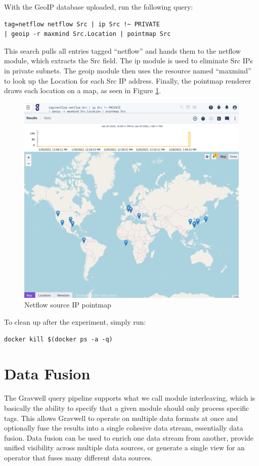 With the GeoIP database uploaded, run the following query:

\begin{Verbatim}[breaklines=true]
tag=netflow netflow Src | ip Src !~ PRIVATE
| geoip -r maxmind Src.Location | pointmap Src
\end{Verbatim}

This search pulls all entries tagged ``netflow'' and hands them to the
netflow module, which extracts the Src field. The ip module is used to
eliminate Src IPs in private subnets. The geoip module then uses the
resource named ``maxmind'' to look up the Location for each Src IP
address. Finally, the pointmap renderer draws each location on a map, as
seen in Figure \ref{fig:maxmind-pointmap}.

\begin{figure}[H]
	\includegraphics[width=0.7\linewidth]{images/maxmind-pointmap.png}
	\caption{Netflow source IP pointmap}
	\label{fig:maxmind-pointmap}
\end{figure}

To clean up after the experiment, simply run:

\begin{Verbatim}[breaklines=true]
docker kill $(docker ps -a -q)
\end{Verbatim}







\section{Data Fusion}

The Gravwell query pipeline supports what we call module interleaving,
which is basically the ability to specify that a given module should only process
specific tags. This allows Gravwell to operate on multiple data formats
at once and optionally fuse the results into a single cohesive data
stream, essentially data fusion. Data fusion can be used to enrich one
data stream from another, provide unified visibility across multiple
data sources, or generate a single view for an operator that fuses many
different data sources.

